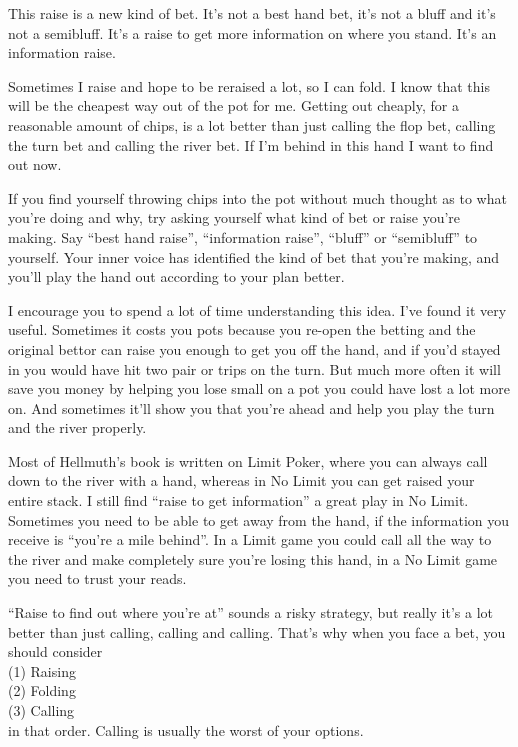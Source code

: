 This raise is a new kind of bet. It's not a best hand bet, it's not a
bluff and it's not a semibluff. It's a raise to get more information
on where you stand. It's an information raise.

Sometimes I raise and hope to be reraised a lot, so I can fold. I know that this
will be the cheapest way out of the pot for me. Getting out cheaply, for
a reasonable amount of chips, is a lot better than just calling the flop bet,
calling the turn bet and calling the river bet. If I'm behind in this hand
I want to find out now.

If you find yourself throwing chips into the pot without much thought
as to what you're doing and why, try asking yourself what kind of
bet or raise you're making. Say ``best hand raise'', ``information raise'',
``bluff'' or ``semibluff'' to yourself. Your inner voice has identified
the kind of bet that you're making, and you'll play the hand out
according to your plan better.

I encourage you to spend a lot of time understanding this idea. I've
found it very useful. Sometimes it costs you pots because you re-open
the betting and the original bettor can raise you enough to get you
off the hand, and if you'd stayed in you would have hit two pair or
trips on the turn. But much more often it will save you money by helping
you lose small on a pot you could have lost a lot more on. And sometimes
it'll show you that you're ahead and help you play the turn and the
river properly.

Most of Hellmuth's book is written on Limit Poker, where you can always
call down to the river with a hand, whereas in No Limit you can get
raised your entire stack. I still find ``raise to get
information'' a great play in No Limit. Sometimes you need to
be able to get away from the hand, if the information you receive
is ``you're a mile behind''. In a Limit game you could call all the
way to the river and make completely sure you're losing this hand, in
a No Limit game you need to trust your reads.

``Raise to find out where you're at'' sounds a risky strategy,
but really it's a lot better than just calling, calling and calling.
That's why when you face a bet, you should consider \\
(1) Raising \\
(2) Folding \\
(3) Calling \\
in that order. Calling is usually the worst of your options.

